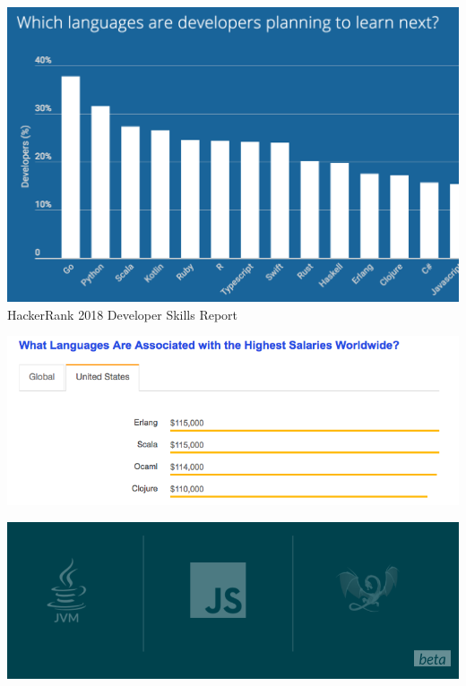 \documentclass{beamer}
\begin{document}
\begin{frame}
    \includegraphics[width=\textwidth]{HackerRank.png}
    HackerRank 2018 Developer Skills Report
\end{frame}

\begin{frame}
    \includegraphics[width=\textwidth]{SO2018US.png}
\end{frame}

\begin{frame}
    \includegraphics[width=\textwidth]{Platforms.png}
\end{frame}
\end{document}
